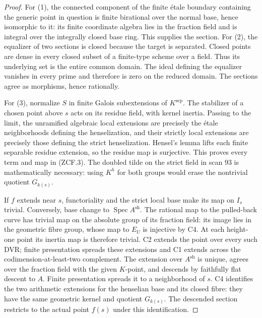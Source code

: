\begin{proof}
For (1), the connected component of the finite \'etale boundary
containing the generic point in question is finite birational over
the normal base, hence isomorphic to it: its finite coordinate
algebra lies in the fraction field and is integral over the
integrally closed base ring. This supplies the section.
For (2), the equalizer of two sections is closed because the
target is separated. Closed points are dense in every closed
subset of a finite-type scheme over a field. Thus its underlying
set is the entire common domain. The ideal defining the equalizer
vanishes in every prime and therefore is zero on the reduced
domain. The sections agree as morphisms, hence rationally.

For (3), normalize $S$ in finite Galois subextensions of
$K^{\mathrm{sep}}$. The stabilizer of a chosen point above $s$
acts on its residue field, with kernel inertia. Passing to the
limit, the unramified algebraic local extensions are precisely
the \'etale neighborhoods defining the henselization, and their
strictly local extensions are precisely those defining the strict
henselization. Hensel's lemma lifts each finite separable residue
extension, so the residue map is surjective. This proves every
term and map in (ZCF.3). The doubled tilde on the strict field
in scan 93 is mathematically necessary: using $K^h$ for both
groups would erase the nontrivial quotient $G_{k(s)}$.

If $f$ extends near $s$, functoriality and the strict local base
make its map on $I_s$ trivial. Conversely, base change to
$\operatorname{Spec}A^{\mathrm{sh}}$. The rational map to the
pulled-back curve has trivial map on the absolute group of its
fraction field: its image lies in the geometric fibre group, whose
map to $E_U$ is injective by C4. At each height-one point its inertia map is
therefore trivial. C2 extends the point over every such DVR;
finite presentation spreads these extensions and C1 extends
across the codimension-at-least-two complement. The extension
over $A^{\mathrm{sh}}$ is unique, agrees over the fraction field
with the given $K$-point, and descends by faithfully flat descent
to $A$. Finite presentation spreads it to a neighborhood of $s$.
C4 identifies the two arithmetic extensions for the henselian
base and its closed fibre: they have the same geometric kernel
and quotient $G_{k(s)}$. The descended section restricts to the
actual point $f(s)$ under this identification.


\end{proof}
